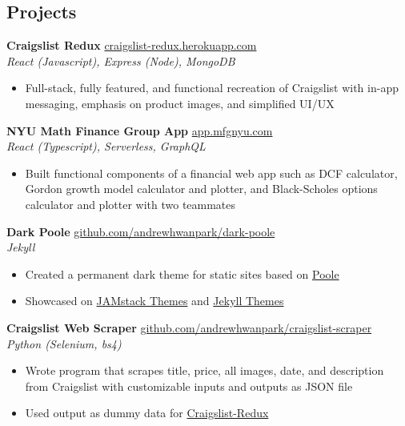 \documentclass[margin]{res}
\begin{document}
\begin{resume}
	\section{Projects} 
	{\bf Craigslist Redux} \hfill \href{http://craigslist-redux.herokuapp.com}{craigslist-redux.herokuapp.com}\\
	{\it React (Javascript), Express (Node), MongoDB}
	\begin{itemize} \itemsep -2pt
		\item Full-stack, fully featured, and functional recreation of Craigslist with in-app messaging, emphasis on product images, and simplified UI/UX
	\end{itemize}
	
	{\bf NYU Math Finance Group App} \hfill\href{https://github.com/mfg-nyu/app}{app.mfgnyu.com}\\
	{\it React (Typescript), Serverless, GraphQL}
	\begin{itemize} \itemsep -2pt
		\item Built functional components of a financial web app such as DCF calculator, Gordon growth model calculator and plotter, and Black-Scholes options calculator and plotter with two teammates
	\end{itemize}
	
	{\bf Dark Poole} \hfill \href{https://github.com/andrewhwanpark/dark-poole}{github.com/andrewhwanpark/dark-poole}\\
	{\it Jekyll}
	\begin{itemize} \itemsep -2pt
		\item Created a permanent dark theme for static sites based on \href{https://github.com/poole/poole}{Poole}
		\item Showcased on \href{https://jamstackthemes.dev/theme/dark-poole/}{JAMstack Themes} and \href{https://jekyll-themes.com/dark-poole/}{Jekyll Themes}
	\end{itemize}
	
	{\bf Craigslist Web Scraper} \hfill \href{https://github.com/andrewhwanpark/craigslist-scraper}{github.com/andrewhwanpark/craigslist-scraper}\\
	{\it Python (Selenium, bs4)}
	\begin{itemize} \itemsep -2pt
		\item Wrote program that scrapes title, price, all images, date, and description from Craigslist with customizable inputs and outputs as JSON file
		\item Used output as dummy data for \href{https://github.com/andrewhwanpark/craigslist-redux}{Craigslist-Redux}
	\end{itemize}
	

\end{resume}
\end{document}
